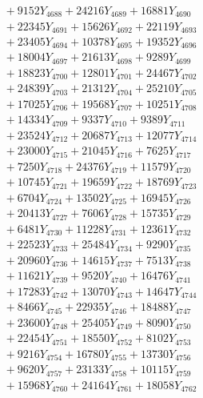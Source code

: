 \documentclass[a4paper,10pt]{article}
\begin{document}
{\begin{align}
&\;  + 9152 Y_{4688} + 24216 Y_{4689} + 16881 Y_{4690} \\[0.3ex]
&\;  + 22345 Y_{4691} + 15626 Y_{4692} + 22119 Y_{4693} \\[0.3ex]
&\;  + 23405 Y_{4694} + 10378 Y_{4695} + 19352 Y_{4696} \\[0.3ex]
&\;  + 18004 Y_{4697} + 21613 Y_{4698} + 9289 Y_{4699} \\[0.3ex]
&\;  + 18823 Y_{4700} + 12801 Y_{4701} + 24467 Y_{4702} \\[0.3ex]
&\;  + 24839 Y_{4703} + 21312 Y_{4704} + 25210 Y_{4705} \\[0.3ex]
&\;  + 17025 Y_{4706} + 19568 Y_{4707} + 10251 Y_{4708} \\[0.5ex]\allowbreak
&\;  + 14334 Y_{4709} + 9337 Y_{4710} + 9389 Y_{4711} \\[0.3ex]
&\;  + 23524 Y_{4712} + 20687 Y_{4713} + 12077 Y_{4714} \\[0.3ex]
&\;  + 23000 Y_{4715} + 21045 Y_{4716} + 7625 Y_{4717} \\[0.3ex]
&\;  + 7250 Y_{4718} + 24376 Y_{4719} + 11579 Y_{4720} \\[0.3ex]
&\;  + 10745 Y_{4721} + 19659 Y_{4722} + 18769 Y_{4723} \\[0.3ex]
&\;  + 6704 Y_{4724} + 13502 Y_{4725} + 16945 Y_{4726} \\[0.3ex]
&\;  + 20413 Y_{4727} + 7606 Y_{4728} + 15735 Y_{4729} \\[0.3ex]
&\;  + 6481 Y_{4730} + 11228 Y_{4731} + 12361 Y_{4732} \\[0.3ex]
&\;  + 22523 Y_{4733} + 25484 Y_{4734} + 9290 Y_{4735} \\[0.3ex]
&\;  + 20960 Y_{4736} + 14615 Y_{4737} + 7513 Y_{4738} \\[0.5ex]\allowbreak
&\;  + 11621 Y_{4739} + 9520 Y_{4740} + 16476 Y_{4741} \\[0.3ex]
&\;  + 17283 Y_{4742} + 13070 Y_{4743} + 14647 Y_{4744} \\[0.3ex]
&\;  + 8466 Y_{4745} + 22935 Y_{4746} + 18488 Y_{4747} \\[0.3ex]
&\;  + 23600 Y_{4748} + 25405 Y_{4749} + 8090 Y_{4750} \\[0.3ex]
&\;  + 22454 Y_{4751} + 18550 Y_{4752} + 8102 Y_{4753} \\[0.3ex]
&\;  + 9216 Y_{4754} + 16780 Y_{4755} + 13730 Y_{4756} \\[0.3ex]
&\;  + 9620 Y_{4757} + 23133 Y_{4758} + 10115 Y_{4759} \\[0.3ex]
&\;  + 15968 Y_{4760} + 24164 Y_{4761} + 18058 Y_{4762} \\[0.3ex]

\end{align}}
\end{document}
